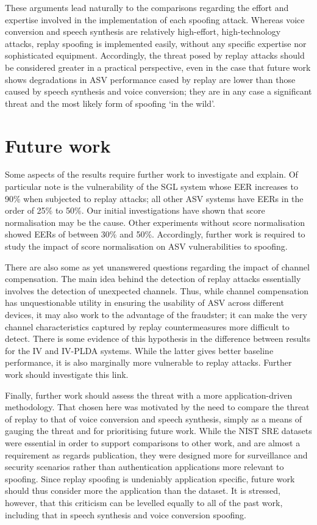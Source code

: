 These arguments lead naturally to the comparisons regarding the effort and expertise involved in the implementation of each spoofing attack.  Whereas voice conversion and speech synthesis are relatively high-effort, high-technology attacks, replay spoofing is implemented easily, without any specific expertise nor sophisticated equipment.  Accordingly, the threat posed by replay attacks should be considered greater in a practical perspective, even in the case that future work shows degradations in ASV performance cased by replay are lower than those caused by speech synthesis and voice conversion; they are in any case a significant threat and the most likely form of spoofing `in the wild'.



\section{Future work}
\label{sec::future}

Some aspects of the results require further work to investigate and explain.  Of particular note is the vulnerability of the SGL system whose EER increases to 90\% when subjected to replay attacks; all other ASV systems have EERs in the order of 25\% to 50\%.  Our initial investigations have shown that score normalisation may be the cause.  Other experiments without score normalisation showed EERs of between 30\% and 50\%.  Accordingly, further work is required to study the impact of score normalisation on ASV vulnerabilities to spoofing. 

There are also some as yet unanswered questions regarding the impact of channel compensation.  The main idea behind the detection of replay attacks essentially involves the detection of unexpected channels.  Thus, while channel compensation has unquestionable utility in ensuring the usability of ASV across different devices, it may also work to the advantage of the fraudster; it can make the very channel characteristics captured by replay countermeasures more difficult to detect.  There is some evidence of this hypothesis in the difference between results for the IV and IV-PLDA systems.  While the latter gives better baseline performance, it is also marginally more vulnerable to replay attacks.  Further work should investigate this link.

Finally, further work should assess the threat with a more application-driven methodology.  That chosen here was motivated by the need to compare the threat of replay to that of voice conversion and speech synthesis, simply as a means of gauging the threat and for prioritising future work.  While the NIST SRE datasets were essential in order to support comparisons to other work, and are almost a requirement as regards publication, they were designed more for surveillance and security scenarios rather than authentication applications more relevant to spoofing.  Since replay spoofing is undeniably application specific, future work should thus consider more the application than the dataset.  It is stressed, however, that this criticism can be levelled equally to all of the past work, including that in speech synthesis and voice conversion spoofing.
